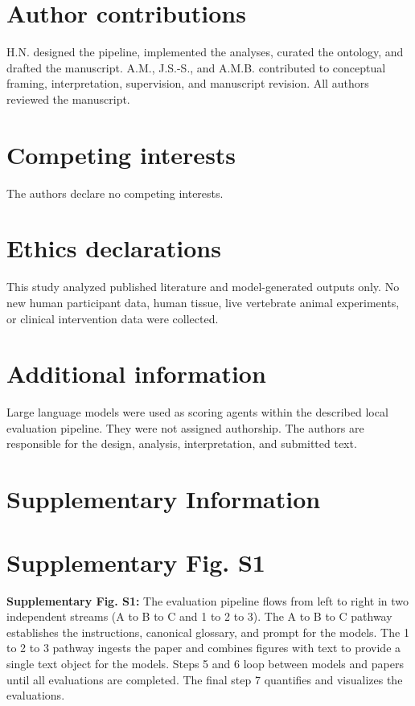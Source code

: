 \documentclass[12pt]{article}
\begin{document}
\section*{Author contributions}\label{author-contributions}
H.N. designed the pipeline, implemented the analyses, curated the ontology, and drafted the manuscript. A.M., J.S.-S., and A.M.B. contributed to conceptual framing, interpretation, supervision, and manuscript revision. All authors reviewed the manuscript.

\section*{Competing interests}\label{competing-interests}
The authors declare no competing interests.

\section*{Ethics declarations}\label{ethics-declarations}
This study analyzed published literature and model-generated outputs only. No new human participant data, human tissue, live vertebrate animal experiments, or clinical intervention data were collected.

\section*{Additional information}\label{additional-information}
Large language models were used as scoring agents within the described local evaluation pipeline. They were not assigned authorship. The authors are responsible for the design, analysis, interpretation, and submitted text.

\clearpage
\appendix
\section*{Supplementary Information}

\section*{Supplementary Fig. S1}
\textbf{Supplementary Fig. S1:} The evaluation pipeline flows from left to right in two independent streams (A to B to C and 1 to 2 to 3). The A to B to C pathway establishes the instructions, canonical glossary, and prompt for the models. The 1 to 2 to 3 pathway ingests the paper and combines figures with text to provide a single text object for the models. Steps 5 and 6 loop between models and papers until all evaluations are completed. The final step 7 quantifies and visualizes the evaluations.
\end{document}
